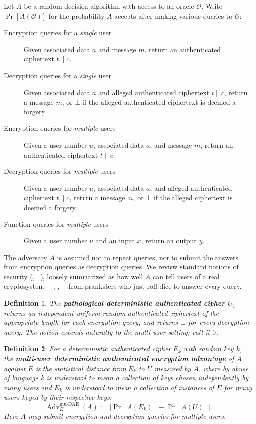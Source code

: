 \documentclass[draft]{article}
\newtheorem{definition}{Definition}
\newcommand{\term}[1]{\textbf{#1}}
\def\operatorsc#1{{%
  \ifmmode\let\next=\operatorname\else\let\next=\relax\fi\next{\textsc{#1}}}}
\def\XSalsa#1/{\operatorsc{XSalsa#1}}
\def\Daence/{\operatorsc{Daence}}
\DeclareMathOperator{\Adv}{Adv}
\DeclareMathOperator{\muDAE}{mu-DAE}
\newcommand{\concat}{\mathbin\|}
\begin{document}
Let $A$ be a random decision algorithm with access to an oracle
 $\mathcal O$.
Write $\Pr[A(\mathcal O)]$ for the probability $A$ accepts after
 making various queries to $\mathcal O$:
%
\begin{description}
  \item[Encryption queries for a \emph{single} user]
    Given associated data $a$ and message $m$, return an authenticated
     ciphertext $t \concat c$.
  \item[Decryption queries for a \emph{single} user]
    Given associated data $a$ and alleged authenticated ciphertext
     $t \concat c$, return a message $m$, or $\bot$ if the alleged
     authenticated ciphertext is deemed a forgery.
  \item[Encryption queries for \emph{multiple} users]
    Given a user number $u$, associated data $a$, and message $m$,
     return an authenticated ciphertext $t \concat c$.
  \item[Decryption queries for \emph{multiple} users]
    Given a user number $u$, associated data $a$, and alleged
     authenticated ciphertext $t \concat c$, return a message $m$, or
     $\bot$ if the alleged ciphertext is deemed a forgery.
  \item[Function queries for \emph{multiple} users]
    Given a user number $u$ and an input $x$, return an output $y$.
\end{description}
%
The adversary $A$ is assumed not to repeat queries, nor to submit the
 answers from encryption queries as decryption queries.
We review standard notions of security
 (\eg,~%
  \cite[Definition~1]{rogaway-shrimpton2006keywrap}%
  \cite[\S3]{bellare-tackmann2016mu-ae-crypto}),
 loosely summarized as how well $A$ can tell users of a real
 cryptosystem---\Daence/, \XSalsa20/, \etc---from pranksters who just
 roll dice to answer every query.

\begin{definition}
  The \term{pathological deterministic authenticated cipher $U_1$}
   returns an independent uniform random authenticated ciphertext of
   the appropriate length for each encryption query, and returns
   $\bot$ for every decryption query.
  The notion extends naturally to the multi-user setting; call it
   $U$.
\end{definition}

\begin{definition}
  For a deterministic authenticated cipher $E_k$ with random key $k$,
   the
   \term{multi-user deterministic authenticated encryption advantage}
   of $A$ against $E$ is the statistical distance from $E_k$ to $U$
   measured by $A$, where by abuse of language $k$ is understood to
   mean a collection of keys chosen independently by many users and
   $E_k$ is understood to mean a collection of instances of $E$ for
   many users keyed by their respective keys:
  \[
    \Adv^{\muDAE}_E(A) := \lvert\Pr[A(E_k)] - \Pr[A(U)]\rvert.
  \]
  Here $A$ may submit encryption and decryption queries for
   \emph{multiple} users.
\end{definition}
\end{document}
